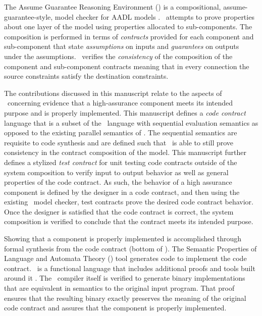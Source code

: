 The Assume Guarantee Reasoning Environment (\agr) is a compositional, assume-guarantee-style, model checker for AADL models \cite{compositional-analysis-agree,nfm:agree}. 
\agr\ attempts to prove properties about one layer of the model using properties allocated to sub-components.
The composition is performed in terms of \emph{contracts} provided for each component and sub-component that state \emph{assumptions} on inputs and \emph{guarantees} on outputs under the assumptions.
\agr\ verifies the \emph{consistency} of the composition of the component and sub-component contracts meaning that in every connection the source constraints satisfy the destination constraints.

The contributions discussed in this manuscript relate to the aspects of \brfcs\ concerning evidence that a high-assurance component meets its intended purpose and is properly implemented.
This manuscript defines a \emph{code contract} language that is a subset of the \agr\ language with sequential evaluation semantics as opposed to the existing parallel semantics of \agr.
The sequential semantics are requisite to code synthesis and are defined such that \agr\ is able to still prove consistency in the contract composition of the model. 
This manuscript further defines a stylized \emph{test contract} for unit testing code contracts outside of the system composition to verify input to output behavior as well as general properties of the code contract.
As such, the behavior of a high assurance component is defined by the designer in a code contract, and then using the existing \agr\ model checker, test contracts prove the desired code contract behavior.
Once the designer is satisfied that the code contract is correct, the system composition is verified to conclude that the contract meets its intended purpose.

Showing that a component is properly implemented is accomplished through formal synthesis from the code contract (bottom of ).
The Semantic Properties of Language and Automata Theory (\splt) tool generates \emph{\ckml} code to implement the code contract.
\ckml\ is a functional language that includes additional proofs and tools built around it \cite{cakeml}.
The \ckml\ compiler itself is verified to generate binary implementations that are equivalent in semantics to the original input program.
That proof ensures that the resulting binary exactly preserves the meaning of the original code contract and assures that the component is properly implemented.